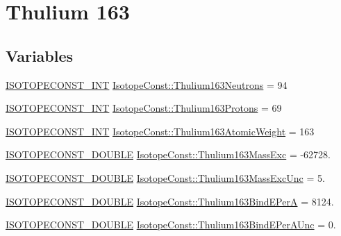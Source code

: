\hypertarget{group___isotope_const-_thulium-_tm163}{}\section{Thulium 163}
\label{group___isotope_const-_thulium-_tm163}
\subsection*{Variables}
\begin{DoxyCompactItemize}
\item 
\mbox{\hyperlink{group___isotope_const-_macros_ga5f18360b3e99483a35c32d789e62621c}{I\+S\+O\+T\+O\+P\+E\+C\+O\+N\+S\+T\+\_\+\+I\+NT}} \mbox{\hyperlink{group___isotope_const-_thulium-_tm163_gaced8897bb178e8523cad9430734e1340}{Isotope\+Const\+::\+Thulium163\+Neutrons}} = 94
\item 
\mbox{\hyperlink{group___isotope_const-_macros_ga5f18360b3e99483a35c32d789e62621c}{I\+S\+O\+T\+O\+P\+E\+C\+O\+N\+S\+T\+\_\+\+I\+NT}} \mbox{\hyperlink{group___isotope_const-_thulium-_tm163_ga190e4d69468bbb2358aa3a7ee9c54f60}{Isotope\+Const\+::\+Thulium163\+Protons}} = 69
\item 
\mbox{\hyperlink{group___isotope_const-_macros_ga5f18360b3e99483a35c32d789e62621c}{I\+S\+O\+T\+O\+P\+E\+C\+O\+N\+S\+T\+\_\+\+I\+NT}} \mbox{\hyperlink{group___isotope_const-_thulium-_tm163_ga7954ef1157272f9b001a13c6d2500446}{Isotope\+Const\+::\+Thulium163\+Atomic\+Weight}} = 163
\item 
\mbox{\hyperlink{group___isotope_const-_macros_ga8f45a7272ce02c0b4c65c44636ed719a}{I\+S\+O\+T\+O\+P\+E\+C\+O\+N\+S\+T\+\_\+\+D\+O\+U\+B\+LE}} \mbox{\hyperlink{group___isotope_const-_thulium-_tm163_gaee27c2c63231e56d42159e442ea3572e}{Isotope\+Const\+::\+Thulium163\+Mass\+Exc}} = -\/62728.
\item 
\mbox{\hyperlink{group___isotope_const-_macros_ga8f45a7272ce02c0b4c65c44636ed719a}{I\+S\+O\+T\+O\+P\+E\+C\+O\+N\+S\+T\+\_\+\+D\+O\+U\+B\+LE}} \mbox{\hyperlink{group___isotope_const-_thulium-_tm163_ga6d07f5a1fd48ab6adf1844bc7a948b83}{Isotope\+Const\+::\+Thulium163\+Mass\+Exc\+Unc}} = 5.
\item 
\mbox{\hyperlink{group___isotope_const-_macros_ga8f45a7272ce02c0b4c65c44636ed719a}{I\+S\+O\+T\+O\+P\+E\+C\+O\+N\+S\+T\+\_\+\+D\+O\+U\+B\+LE}} \mbox{\hyperlink{group___isotope_const-_thulium-_tm163_gae90ce3c893a9b59b315bad84cc29c435}{Isotope\+Const\+::\+Thulium163\+Bind\+E\+PerA}} = 8124.
\item 
\mbox{\hyperlink{group___isotope_const-_macros_ga8f45a7272ce02c0b4c65c44636ed719a}{I\+S\+O\+T\+O\+P\+E\+C\+O\+N\+S\+T\+\_\+\+D\+O\+U\+B\+LE}} \mbox{\hyperlink{group___isotope_const-_thulium-_tm163_ga044c9bde67b80d5553bc0648ccfc8ba4}{Isotope\+Const\+::\+Thulium163\+Bind\+E\+Per\+A\+Unc}} = 0.

\end{DoxyCompactItemize}
